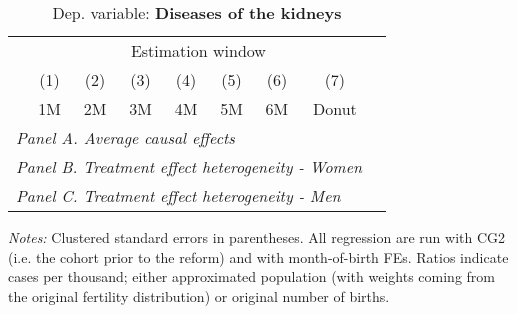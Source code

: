 \begin{table}[H] \begin{threeparttable} \centering \caption{Dep. variable: \textbf{Diseases of the kidneys}} {\def\sym#1{\ifmmode^{#1}\else\(^{#1}\)\fi} \begin{tabular}{l*{8}{c}} \toprule & \multicolumn{7}{c}{Estimation window} \\ \cmidrule(lr){2-8}
            &\multicolumn{1}{c}{(1)}&\multicolumn{1}{c}{(2)}&\multicolumn{1}{c}{(3)}&\multicolumn{1}{c}{(4)}&\multicolumn{1}{c}{(5)}&\multicolumn{1}{c}{(6)}&\multicolumn{1}{c}{(7)}\\
            &\multicolumn{1}{c}{1M}&\multicolumn{1}{c}{2M}&\multicolumn{1}{c}{3M}&\multicolumn{1}{c}{4M}&\multicolumn{1}{c}{5M}&\multicolumn{1}{c}{6M}&\multicolumn{1}{c}{Donut}\\
\midrule
 \multicolumn{8}{l}{\emph{Panel A. Average causal effects}} \\       \midrule\multicolumn{8}{l}{\emph{Panel B. Treatment effect heterogeneity - Women}} \\       \midrule\multicolumn{8}{l}{\emph{Panel C. Treatment effect heterogeneity - Men}} \\       
\bottomrule \end{tabular} } \begin{tablenotes} \item \scriptsize \emph{Notes:} Clustered standard errors in parentheses. All regression are run with CG2 (i.e. the cohort prior to the reform) and with month-of-birth FEs. Ratios indicate cases per thousand; either approximated population (with weights coming from the original fertility distribution) or original number of births. \end{tablenotes} \end{threeparttable} \end{table} 
